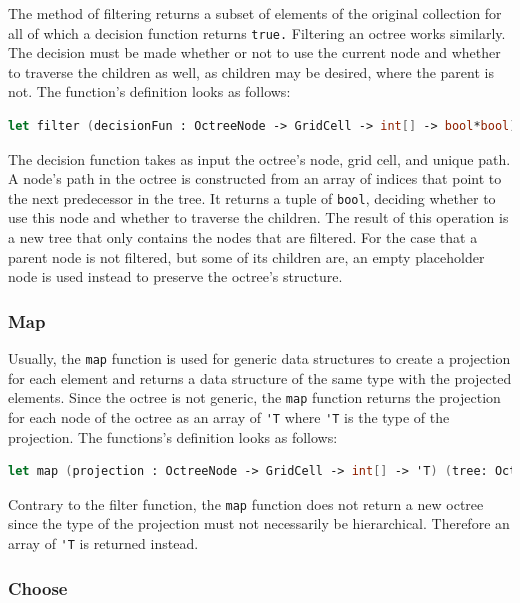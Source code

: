 The method of filtering returns a subset of elements of the original collection for all of which a decision function returns \verb|true.|
Filtering an octree works similarly. The decision must be made whether or not to use the current node and whether to traverse the children as well, as children may be desired, where the parent is not. 
The function's definition looks as follows: 

\begin{lstlisting}[language = FSharp]
let filter (decisionFun : OctreeNode -> GridCell -> int[] -> bool*bool) (tree: Octree) : (Octree)= ...
\end{lstlisting}

The decision function takes as input the octree's node, grid cell, and unique path. A node's path in the octree is constructed from an array of indices that point to the next predecessor in the tree. It returns a tuple of \verb|bool|, deciding whether to use this node and whether to traverse the children. The result of this operation is a new tree that only contains the nodes that are filtered. For the case that a parent node is not filtered, but some of its children are, an empty placeholder node is used instead to preserve the octree's structure. 


\subsubsection{Map}

Usually, the \verb|map| function is used for generic data structures to create a projection for each element and returns a data structure of the same type with the projected elements. Since the octree is not generic, the \verb|map| function returns the projection for each node of the octree as an array of \verb|'T| where \verb|'T| is the type of the projection. 
The functions's definition looks as follows: 

\begin{lstlisting}[language = FSharp]
let map (projection : OctreeNode -> GridCell -> int[] -> 'T) (tree: Octree) : ('T[])= ...
\end{lstlisting}

Contrary to the filter function, the \verb|map| function does not return a new octree since the type of the projection must not necessarily be hierarchical. Therefore an array of \verb|'T| is returned instead. 


\subsubsection{Choose}

